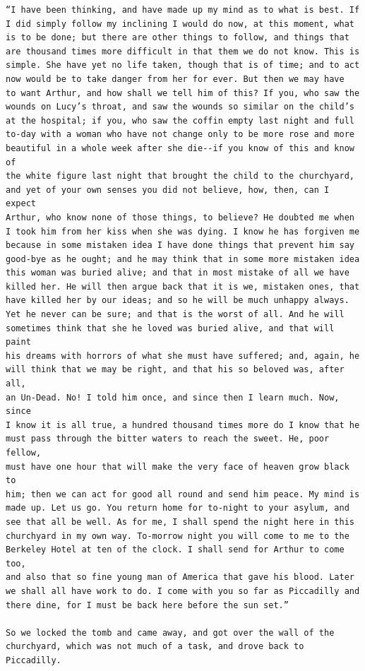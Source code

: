 \documentclass{article}
\begin{document}
\begin{verbatim}
“I have been thinking, and have made up my mind as to what is best. If
I did simply follow my inclining I would do now, at this moment, what
is to be done; but there are other things to follow, and things that
are thousand times more difficult in that them we do not know. This is
simple. She have yet no life taken, though that is of time; and to act
now would be to take danger from her for ever. But then we may have
to want Arthur, and how shall we tell him of this? If you, who saw the
wounds on Lucy’s throat, and saw the wounds so similar on the child’s
at the hospital; if you, who saw the coffin empty last night and full
to-day with a woman who have not change only to be more rose and more
beautiful in a whole week after she die--if you know of this and know of
the white figure last night that brought the child to the churchyard,
and yet of your own senses you did not believe, how, then, can I expect
Arthur, who know none of those things, to believe? He doubted me when
I took him from her kiss when she was dying. I know he has forgiven me
because in some mistaken idea I have done things that prevent him say
good-bye as he ought; and he may think that in some more mistaken idea
this woman was buried alive; and that in most mistake of all we have
killed her. He will then argue back that it is we, mistaken ones, that
have killed her by our ideas; and so he will be much unhappy always.
Yet he never can be sure; and that is the worst of all. And he will
sometimes think that she he loved was buried alive, and that will paint
his dreams with horrors of what she must have suffered; and, again, he
will think that we may be right, and that his so beloved was, after all,
an Un-Dead. No! I told him once, and since then I learn much. Now, since
I know it is all true, a hundred thousand times more do I know that he
must pass through the bitter waters to reach the sweet. He, poor fellow,
must have one hour that will make the very face of heaven grow black to
him; then we can act for good all round and send him peace. My mind is
made up. Let us go. You return home for to-night to your asylum, and
see that all be well. As for me, I shall spend the night here in this
churchyard in my own way. To-morrow night you will come to me to the
Berkeley Hotel at ten of the clock. I shall send for Arthur to come too,
and also that so fine young man of America that gave his blood. Later
we shall all have work to do. I come with you so far as Piccadilly and
there dine, for I must be back here before the sun set.”

So we locked the tomb and came away, and got over the wall of the
churchyard, which was not much of a task, and drove back to Piccadilly.



\end{verbatim}
\end{document}
